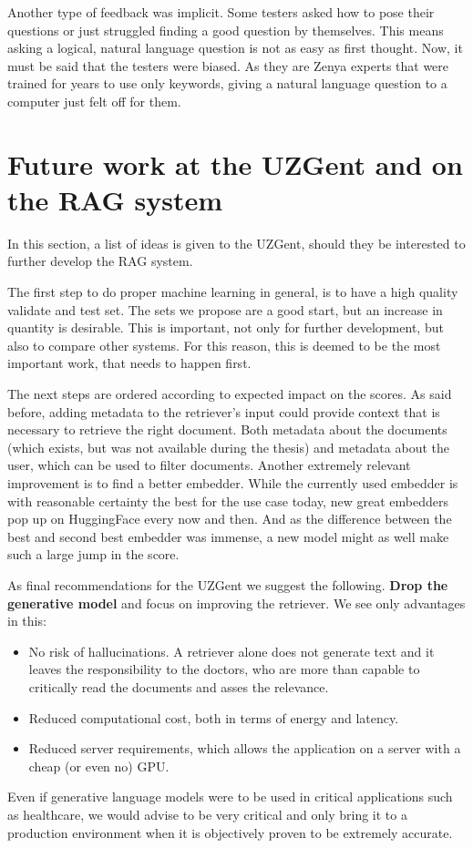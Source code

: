 Another type of feedback was implicit. Some testers asked how to pose their questions or just struggled finding a good question by themselves. This means asking a logical, natural language question is not as easy as first thought. Now, it must be said that the testers were biased. As they are Zenya experts that were trained for years to use only keywords, giving a natural language question to a computer just felt off for them.

\section{Future work at the UZGent and on the RAG system}
In this section, a list of ideas is given to the UZGent, should they be interested to further develop the RAG system.

The first step to do proper machine learning in general, is to have a high quality validate and test set. The sets we propose are a good start, but an increase in quantity is desirable. This is important, not only for further development, but also to compare other systems. For this reason, this is deemed to be the most important work, that needs to happen first. 

The next steps are ordered according to expected impact on the scores. As said before, adding metadata to the retriever's input could provide context that is necessary to retrieve the right document. Both metadata about the documents (which exists, but was not available during the thesis) and metadata about the user, which can be used to filter documents. Another extremely relevant improvement is to find a better embedder. While the currently used embedder is with reasonable certainty the best for the use case today, new great embedders pop up on HuggingFace every now and then. And as the difference between the best and second best embedder was immense, a new model might as well make such a large jump in the score.

As final recommendations for the UZGent we suggest the following. \textbf{Drop the generative model} and focus on improving the retriever. We see only advantages in this:
\begin{itemize}
    \item No risk of hallucinations. A retriever alone does not generate text and it leaves the responsibility to the doctors, who are more than capable to critically read the documents and asses the relevance.
    \item Reduced computational cost, both in terms of energy and latency.
    \item Reduced server requirements, which allows the application on a server with a cheap (or even no) GPU.
\end{itemize}
Even if generative language models were to be used in critical applications such as healthcare, we would advise to be very critical and only bring it to a production environment when it is objectively proven to be extremely accurate.

